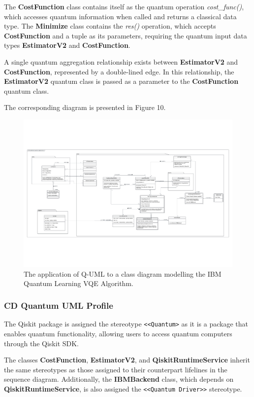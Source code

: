 \documentclass{article}
\begin{document}
The \textbf{CostFunction} class contains itself as the quantum operation \textit{cost\_func()}, which accesses quantum information when called and returns a classical data type. The \textbf{Minimize} class contains the \textit{res()} operation, which accepts \textbf{CostFunction} and a tuple as its parameters, requiring the quantum input data types \textbf{EstimatorV2} and \textbf{CostFunction}.

A single quantum aggregation relationship exists between \textbf{EstimatorV2} and \textbf{CostFunction}, represented by a double-lined edge. In this relationship, the \textbf{EstimatorV2} quantum class is passed as a parameter to the \textbf{CostFunction} quantum class.

The corresponding diagram is presented in Figure 10.

\begin{figure}
    \centering
    \includegraphics[width=1\linewidth]{VQE QUML CD Final Version.pdf}
    \caption{The application of Q-UML to a class diagram modelling the IBM Quantum Learning VQE Algorithm.}
    \label{fig:Q-UML_CD}
\end{figure}

\subsubsection{CD Quantum UML Profile}

The Qiskit package is assigned the stereotype \texttt{<<Quantum>} as it is a package that enables quantum functionality, allowing users to access quantum computers through the Qiskit SDK. 

The classes \textbf{CostFunction}, \textbf{EstimatorV2}, and \textbf{QiskitRuntimeService} inherit the same stereotypes as those assigned to their counterpart lifelines in the sequence diagram. Additionally, the \textbf{IBMBackend} class, which depends on \textbf{QiskitRuntimeService}, is also assigned the \texttt{<<Quantum Driver>>} stereotype.
\end{document}
